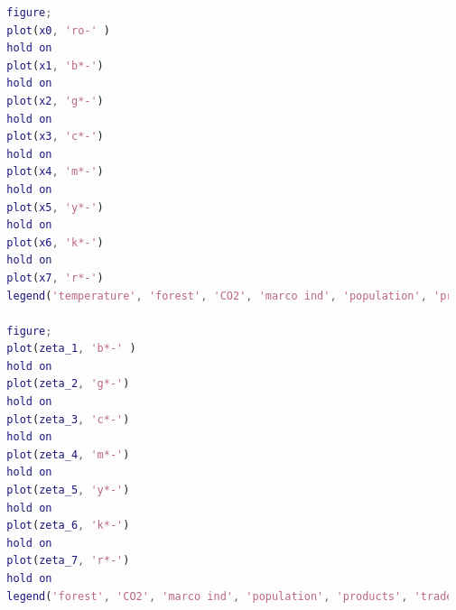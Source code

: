 \documentclass{apmcmthesis}
\begin{document}
\begin{lstlisting}[language=matlab, caption={The matlab source code of GRA}]
  %show
  figure;
  plot(x0, 'ro-' )
  hold on
  plot(x1, 'b*-')
  hold on
  plot(x2, 'g*-')
  hold on
  plot(x3, 'c*-')
  hold on
  plot(x4, 'm*-')
  hold on
  plot(x5, 'y*-')
  hold on
  plot(x6, 'k*-')
  hold on
  plot(x7, 'r*-')
  legend('temperature', 'forest', 'CO2', 'marco ind', 'population', 'products', 'trade', 'agricultral land')
      
  figure;
  plot(zeta_1, 'b*-' )
  hold on
  plot(zeta_2, 'g*-')
  hold on
  plot(zeta_3, 'c*-')
  hold on
  plot(zeta_4, 'm*-')
  hold on
  plot(zeta_5, 'y*-')
  hold on
  plot(zeta_6, 'k*-')
  hold on
  plot(zeta_7, 'r*-')
  hold on
  legend('forest', 'CO2', 'marco ind', 'population', 'products', 'trade', 'agricultral land')
  \end{lstlisting}
  
\end{document}
